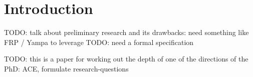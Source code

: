 \section{Introduction}

TODO: talk about preliminary research and its drawbacks: need something like FRP / Yampa to leverage
TODO: need a formal specification

TODO: this is a paper for working out the depth of one of the directions of the PhD: ACE, formulate research-questions
